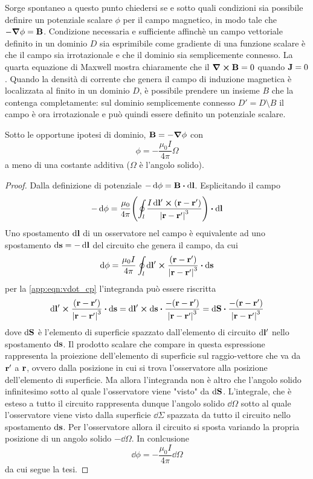 Sorge spontaneo a questo punto chiedersi se e sotto quali condizioni sia possibile definire un
potenziale scalare $\phi$ per il campo magnetico, in modo tale che $-\grad\phi=\vb{B}$.
Condizione necessaria e sufficiente affinchè un campo vettoriale definito in un dominio $D$
sia esprimibile come gradiente di una funzione scalare è che il campo sia irrotazionale
e che il dominio sia semplicemente connesso.
La quarta equazione di Maxwell mostra chiaramente che il $\curl{\vb{B}}=0$ quando $\vb{J}=0$.
Quando la densità di corrente che genera il campo di induzione magnetica è localizzata
al finito in un dominio $D$, è possibile prendere un insieme $B$ che la contenga completamente:
sul dominio semplicemente connesso $D'=D\setminus B$ il campo è ora irrotazionale e può quindi
essere definito un potenziale scalare.
\begin{thm}
    Sotto le opportune ipotesi di dominio, $\vb{B}=-\grad\phi$ con
    \[
        \phi=-\frac{\mu_0 I}{4\pi}\Omega
    \]
    a meno di una costante additiva ($\Omega$ è l'angolo solido).
\end{thm}
\begin{proof}
    Dalla definizione di potenziale $-\dd{\phi}=\vb{B}\vdot\dd{\vb{l}}$. Esplicitando il campo
    \[
        -\dd{\phi}=\frac{\mu_0}{4\pi}\Biggl(\oint_l \frac{I\dd{\vb{l}'}\cp(\vb{r}-\vb{r}')}{\abs{\vb{r}-\vb{r}'}^3}\Biggr)\vdot\dd{\vb{l}}
    \]
    Uno spostamento $\dd{\vb{l}}$ di un osservatore nel campo è equivalente ad uno spostamento $\dd{\vb{s}}=-\dd{\vb{l}}$
    del circuito che genera il campo, da cui
    \[
        \dd{\phi}=\frac{\mu_0 I}{4\pi}\oint_l \dd{\vb{l}'}\cp\frac{(\vb{r}-\vb{r}')}{\abs{\vb{r}-\vb{r}'}^3}\vdot\dd{\vb{s}}
    \]
    per la \eqref{app:eqn:vdot_cp} l'integranda può essere riscritta
    \[
        \dd{\vb{l}'}\cp\frac{(\vb{r}-\vb{r}')}{\abs{\vb{r}-\vb{r}'}^3}\vdot\dd{\vb{s}}=
        \dd{\vb{l}'}\cp\dd{\vb{s}}\vdot\frac{-(\vb{r}-\vb{r}')}{\abs{\vb{r}-\vb{r}'}^3}=
        \dd{\vb{S}} \vdot \frac{-(\vb{r}-\vb{r}')}{\abs{\vb{r}-\vb{r}'}^3}
    \]
    dove $\dd{\vb{S}}$ è l'elemento di superficie spazzato dall'elemento di circuito $\dd{\vb{l}'}$ nello spostamento $\dd{\vb{s}}$.
    Il prodotto scalare che compare in questa espressione rappresenta la proiezione dell'elemento di superficie
    sul raggio-vettore che va da $\vb{r}'$ a $\vb{r}$, ovvero dalla posizione in cui si trova l'osservatore alla posizione
    dell'elemento di superficie. Ma allora l'integranda non è altro che l'angolo solido infinitesimo sotto al quale
    l'osservatore viene "visto" da $\dd{\vb{S}}$. L'integrale, che è esteso a tutto il circuito rappresenta dunque
    l'angolo solido $\dd{\Omega}$ sotto al quale l'osservatore viene visto dalla superficie $\dd{\Sigma}$ spazzata da tutto il circuito
    nello spostamento $\dd{\vb{s}}$. Per l'osservatore allora il circuito si sposta variando la propria posizione di un
    angolo solido $-\dd{\Omega}$. In conlcusione
    \[
        \dd{\phi}=-\frac{\mu_0 I}{4\pi}\dd{\Omega}
    \]
    da cui segue la tesi.
\end{proof}

